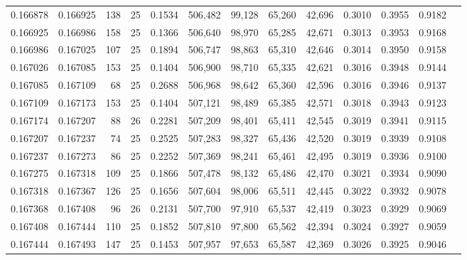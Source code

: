 \begin{tabular}{rrrrrrrrrrrrr}
0.166878 & 0.166925 &   138 &  25 &                                     0.1534 & 506,482 &  99,128 &  65,260 &  42,696 & 0.3010 & 0.3955 & 0.9182 \\
0.166925 & 0.166986 &   158 &  25 &                                     0.1366 & 506,640 &  98,970 &  65,285 &  42,671 & 0.3013 & 0.3953 & 0.9168 \\
0.166986 & 0.167025 &   107 &  25 &                                     0.1894 & 506,747 &  98,863 &  65,310 &  42,646 & 0.3014 & 0.3950 & 0.9158 \\
0.167026 & 0.167085 &   153 &  25 &                                     0.1404 & 506,900 &  98,710 &  65,335 &  42,621 & 0.3016 & 0.3948 & 0.9144 \\
0.167085 & 0.167109 &    68 &  25 &                                     0.2688 & 506,968 &  98,642 &  65,360 &  42,596 & 0.3016 & 0.3946 & 0.9137 \\
0.167109 & 0.167173 &   153 &  25 &                                     0.1404 & 507,121 &  98,489 &  65,385 &  42,571 & 0.3018 & 0.3943 & 0.9123 \\
0.167174 & 0.167207 &    88 &  26 &                                     0.2281 & 507,209 &  98,401 &  65,411 &  42,545 & 0.3019 & 0.3941 & 0.9115 \\
0.167207 & 0.167237 &    74 &  25 &                                     0.2525 & 507,283 &  98,327 &  65,436 &  42,520 & 0.3019 & 0.3939 & 0.9108 \\
0.167237 & 0.167273 &    86 &  25 &                                     0.2252 & 507,369 &  98,241 &  65,461 &  42,495 & 0.3019 & 0.3936 & 0.9100 \\
0.167275 & 0.167318 &   109 &  25 &                                     0.1866 & 507,478 &  98,132 &  65,486 &  42,470 & 0.3021 & 0.3934 & 0.9090 \\
0.167318 & 0.167367 &   126 &  25 &                                     0.1656 & 507,604 &  98,006 &  65,511 &  42,445 & 0.3022 & 0.3932 & 0.9078 \\
0.167368 & 0.167408 &    96 &  26 &                                     0.2131 & 507,700 &  97,910 &  65,537 &  42,419 & 0.3023 & 0.3929 & 0.9069 \\
0.167408 & 0.167444 &   110 &  25 &                                     0.1852 & 507,810 &  97,800 &  65,562 &  42,394 & 0.3024 & 0.3927 & 0.9059 \\
0.167444 & 0.167493 &   147 &  25 &                                     0.1453 & 507,957 &  97,653 &  65,587 &  42,369 & 0.3026 & 0.3925 & 0.9046 \\

\end{tabular}
